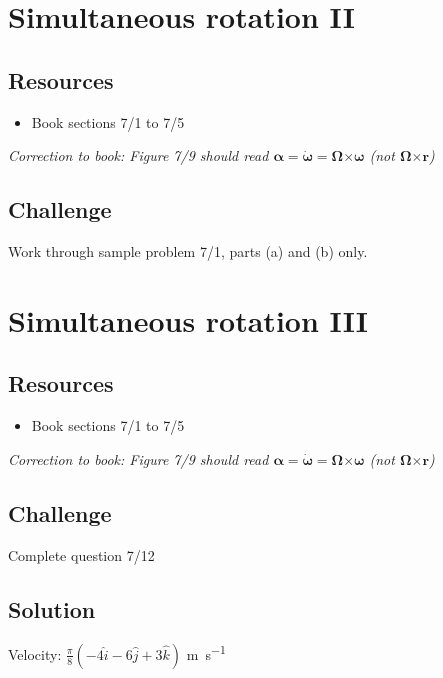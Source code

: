 \newpage
\section{Simultaneous rotation II}

\subsection*{Resources}
\begin{itemize}
    \item Book sections 7/1 to 7/5
\end{itemize}

\emph{Correction to book: Figure 7/9 should read $\bm{\alpha} = \bm{\dot{\omega}} = \bm{\Omega} \bm{\times} \bm{\omega}$ (not $\bm{\Omega} \bm{\times} \bm{r}$)}

\subsection*{Challenge}
Work through sample problem 7/1, parts (a) and (b) only.




\newpage
\section{Simultaneous rotation III}

\subsection*{Resources}
\begin{itemize}
    \item Book sections 7/1 to 7/5
\end{itemize}

\emph{Correction to book: Figure 7/9 should read $\bm{\alpha} = \bm{\dot{\omega}} = \bm{\Omega} \bm{\times} \bm{\omega}$ (not $\bm{\Omega} \bm{\times} \bm{r}$)}

\subsection*{Challenge}
Complete question 7/12


\subsection*{Solution}
Velocity: $\frac{\pi}{8}(-4 \hat{i} - 6 \hat{j} + 3 \hat{k})$ \si{\meter\per\second}

